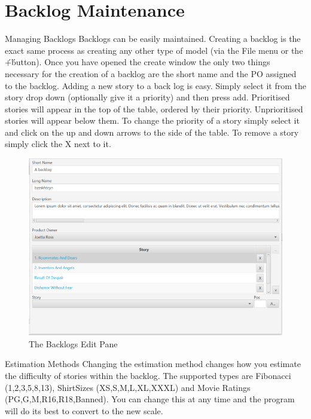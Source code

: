 \section{Backlog Maintenance}

Managing Backlogs
\newline\newline
Backlogs can be easily maintained. Creating a backlog is the exact same process as creating any other type of model (via the File menu or the \'+\' button). Once you have opened the create window the only two things necessary for the creation of a backlog are the short name and the PO assigned to the backlog.
\newline
Adding a new story to a back log is easy. Simply select it from the story drop down (optionally give it a priority) and then press add. Prioritised stories will appear in the top of the table, ordered by their priority. Unprioritised stories will appear below them. To change the priority of a story simply select it and click on the up and down arrows to the side of the table. To remove a story simply click the X next to it.

\begin{figure}[H]
\centering
\includegraphics[width=\textwidth]{images/screenshots/backlogs.PNG}
\caption{The Backlogs Edit Pane}
\label{fig:new_project}
\end{figure}

\newline
Estimation Methods
\newline
Changing the estimation method changes how you estimate the difficulty of stories within the backlog. The supported types are Fibonacci (1,2,3,5,8,13), ShirtSizes (XS,S,M,L,XL,XXXL) and Movie Ratings (PG,G,M,R16,R18,Banned). You can change this at any time and the program will do its best to convert to the new scale.


